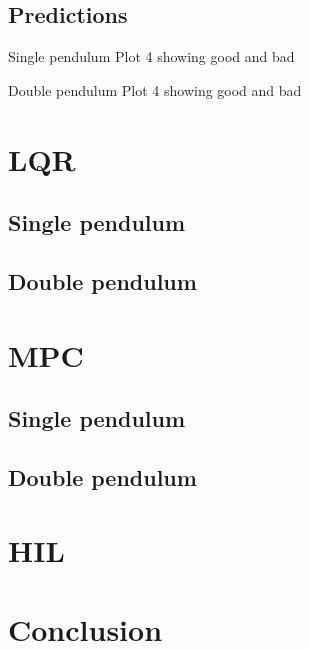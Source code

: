         \subsection{Predictions}
            Single pendulum
            Plot 4 showing good and bad

            Double pendulum
            Plot 4 showing good and bad

    \section{LQR}
        \subsection{Single pendulum}
        \subsection{Double pendulum}

    \section{MPC}
        \subsection{Single pendulum}
        \subsection{Double pendulum}

    \section{HIL}

    \section{Conclusion}



